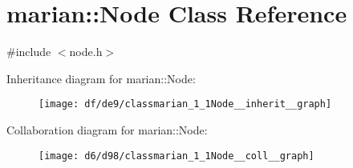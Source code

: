 \hypertarget{classmarian_1_1Node}{}\section{marian\+:\+:Node Class Reference}
\label{classmarian_1_1Node}


{\ttfamily \#include $<$node.\+h$>$}



Inheritance diagram for marian\+:\+:Node\+:
\nopagebreak
\begin{figure}[H]
\begin{center}
\leavevmode
\texttt{[image: df/de9/classmarian\_1\_1Node\_\_inherit\_\_graph]}
\end{center}
\end{figure}


Collaboration diagram for marian\+:\+:Node\+:
\nopagebreak
\begin{figure}[H]
\begin{center}
\leavevmode
\texttt{[image: d6/d98/classmarian\_1\_1Node\_\_coll\_\_graph]}
\end{center}
\end{figure}
